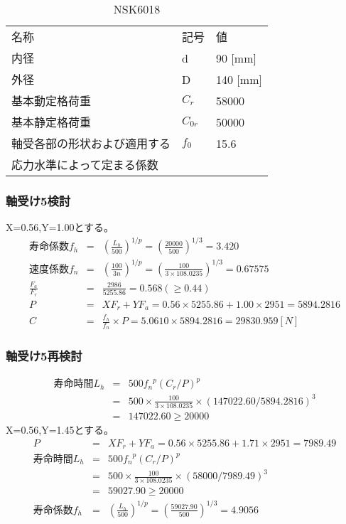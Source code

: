 \begin{table}[htb]
\begin{center}
  \caption{NSK6018}
  \begin{tabular}{lll} \hline
名称&記号&値\\
内径& d & 90 [mm]\\
外径& D & 140 [mm]\\
基本動定格荷重&$C_{r}$&58000\\
基本静定格荷重&$C_{0r}$&50000\\
軸受各部の形状および適用する&$f_0$&15.6\\
応力水準によって定まる係数&&\\
\hline
  \end{tabular}
\end{center}
\end{table}

\subsubsection{軸受け5検討}
X=0.56,Y=1.00とする。
\begin{eqnarray}
寿命係数f_h &=& \left( \frac{L_h}{500} \right)^{1/p} = \left( \frac{20000}{500} \right)^{1/3} = 3.420\\
速度係数f_n &=& \left( \frac{100}{3n} \right)^{1/p} = \left( \frac{100}{3 \times 108.0235} \right)^{1/3} = 0.67575\\
\frac{F_a}{F_r} &=& \frac{2986}{5255.86} = 0.568(\geq 0.44)\\
P &=& XF_r+YF_a = 0.56 \times 5255.86 + 1.00 \times 2951 = 5894.2816\\
C &=& \frac{f_h}{f_n} \times P = 5.0610 \times 5894.2816 = 29830.959[N]
\end{eqnarray}

\subsubsection{軸受け5再検討}
\begin{eqnarray}
寿命時間L_h &=& 500{f_n}^p(C_r/P)^p\\
           &=& 500 \times \frac{100}{3 \times 108.0235} \times (147022. 60/5894.2816)^3\\
           &=& 147022.60 \geq 20000
\end{eqnarray}
X=0.56,Y=1.45とする。
\begin{eqnarray}
P &=& XF_r+YF_a = 0.56 \times 5255.86 + 1.71 \times 2951 =7989.49\\
寿命時間L_h &=& 500{f_n}^p(C_r/P)^p\\
           &=& 500 \times \frac{100}{3 \times 108.0235} \times (58000/7989.49)^3\\
           &=& 59027.90 \geq 20000\\
寿命係数f_h &=& \left( \frac{L_h}{500} \right)^{1/p} = \left( \frac{59027.90}{500} \right)^{1/3} = 4.9056
\end{eqnarray}
